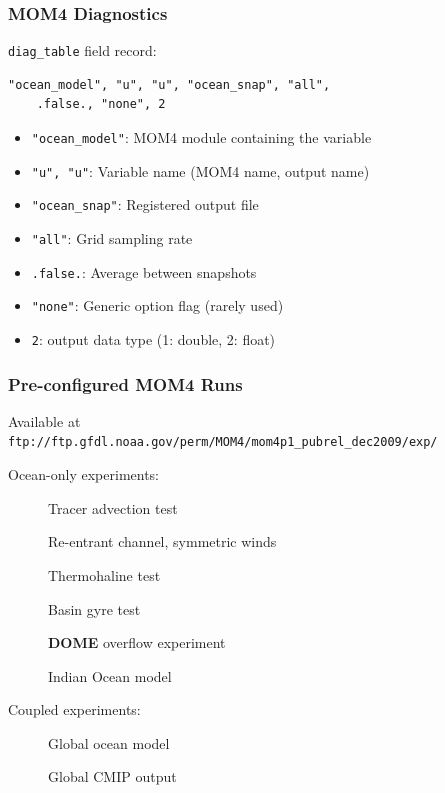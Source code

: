 \documentclass{beamer}
\begin{document}
\begin{frame}[fragile]
    \frametitle{MOM4 Diagnostics}
    
    \lstinline|diag_table| field record:
    \begin{lstlisting}
"ocean_model", "u", "u", "ocean_snap", "all",
    .false., "none", 2
    \end{lstlisting}
    \begin{itemize}
        \item \lstinline|"ocean_model"|: MOM4 module containing the variable
        \item \lstinline|"u", "u"|: Variable name (MOM4 name, output name)
        \item \lstinline|"ocean_snap"|: Registered output file
        \item \lstinline|"all"|: Grid sampling rate
        \item \lstinline|.false.|: Average between snapshots
        \item \lstinline|"none"|: Generic option flag (rarely used)
        \item \lstinline|2|: output data type (1: double, 2: float)
    \end{itemize}
\end{frame}

\begin{frame}[fragile]
    \frametitle{Pre-configured MOM4 Runs}
    
    Available at
    {\small
    \lstinline|ftp://ftp.gfdl.noaa.gov/perm/MOM4/mom4p1_pubrel_dec2009/exp/|}
    
    \vspace{10pt}

    Ocean-only experiments:
    \begin{description}
        \item[] Tracer advection test
        \item[] Re-entrant channel, symmetric winds
        \item[] Thermohaline test
        \item[] Basin gyre test
        \item[] \textbf{DOME} overflow experiment
        \item[] Indian Ocean model
    \end{description}
    
    Coupled experiments:
    \begin{description}
        \item[] Global ocean model
        \item[] Global CMIP output
    \end{description}
\end{frame}
\end{document}
